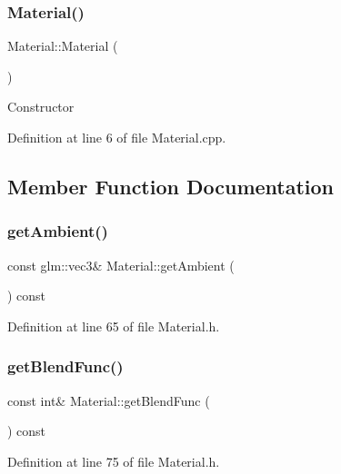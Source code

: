 \subsubsection{\texorpdfstring{Material()}{Material()}}
{\footnotesize\ttfamily Material\+::\+Material (\begin{DoxyParamCaption}{ }\end{DoxyParamCaption})}

Constructor 

Definition at line 6 of file Material.\+cpp.



\subsection{Member Function Documentation}
\mbox{\label{class_material_a61bafc60f2755cc546f3a6dc5736a6ae}} 
\subsubsection{\texorpdfstring{get\+Ambient()}{getAmbient()}}
{\footnotesize\ttfamily const glm\+::vec3\& Material\+::get\+Ambient (\begin{DoxyParamCaption}{ }\end{DoxyParamCaption}) const\hspace{0.3cm}{\ttfamily [inline]}}



Definition at line 65 of file Material.\+h.

\mbox{\label{class_material_ac8bb3627639e5454d58e9a9553ed1654}} 
\subsubsection{\texorpdfstring{get\+Blend\+Func()}{getBlendFunc()}}
{\footnotesize\ttfamily const int\& Material\+::get\+Blend\+Func (\begin{DoxyParamCaption}{ }\end{DoxyParamCaption}) const\hspace{0.3cm}{\ttfamily [inline]}}



Definition at line 75 of file Material.\+h.

